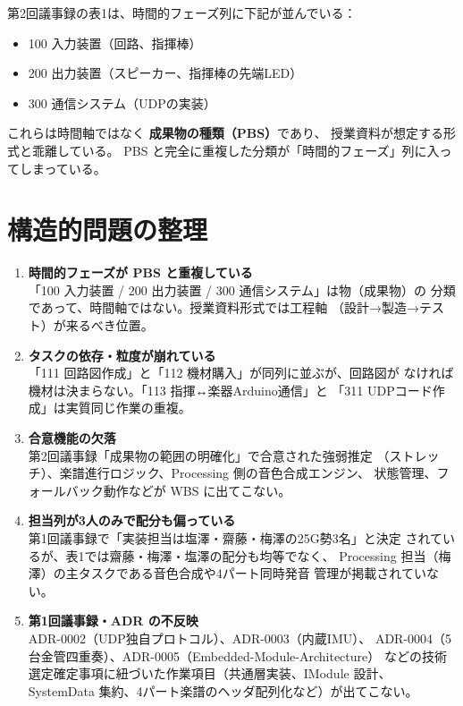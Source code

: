 \documentclass[lualatex,book,paper=a4paper,jafontsize=11pt,jafontscale=1.05]{jlreq}
\begin{document}
第2回議事録の表1は、時間的フェーズ列に下記が並んでいる：

\begin{itemize}
  \item 100 入力装置（回路、指揮棒）
  \item 200 出力装置（スピーカー、指揮棒の先端LED）
  \item 300 通信システム（UDPの実装）
\end{itemize}

これらは時間軸ではなく \textbf{成果物の種類（PBS）}であり、
授業資料が想定する形式と乖離している。
PBS と完全に重複した分類が「時間的フェーズ」列に入ってしまっている。

\section{構造的問題の整理}

\begin{tcolorbox}[colback=lightgray, colframe=warnred, title={\bfseries 議事録 表1 の構造的問題}, breakable]
\begin{enumerate}
  \item \textbf{時間的フェーズが PBS と重複している}\\
        「100 入力装置 / 200 出力装置 / 300 通信システム」は物（成果物）の
        分類であって、時間軸ではない。授業資料形式では工程軸
        （設計→製造→テスト）が来るべき位置。
  \item \textbf{タスクの依存・粒度が崩れている}\\
        「111 回路図作成」と「112 機材購入」が同列に並ぶが、回路図が
        なければ機材は決まらない。「113 指揮↔楽器Arduino通信」と
        「311 UDPコード作成」は実質同じ作業の重複。
  \item \textbf{合意機能の欠落}\\
        第2回議事録「成果物の範囲の明確化」で合意された強弱推定
        （ストレッチ）、楽譜進行ロジック、Processing 側の音色合成エンジン、
        状態管理、フォールバック動作などが WBS に出てこない。
  \item \textbf{担当列が3人のみで配分も偏っている}\\
        第1回議事録で「実装担当は塩澤・齋藤・梅澤の25G勢3名」と決定
        されているが、表1では齋藤・梅澤・塩澤の配分も均等でなく、
        Processing 担当（梅澤）の主タスクである音色合成や4パート同時発音
        管理が掲載されていない。
  \item \textbf{第1回議事録・ADR の不反映}\\
        ADR-0002（UDP独自プロトコル）、ADR-0003（内蔵IMU）、
        ADR-0004（5台金管四重奏）、ADR-0005（Embedded-Module-Architecture）
        などの技術選定確定事項に紐づいた作業項目（共通層実装、IModule 設計、
        SystemData 集約、4パート楽譜のヘッダ配列化など）が出てこない。
\end{enumerate}
\end{tcolorbox}
\end{document}
